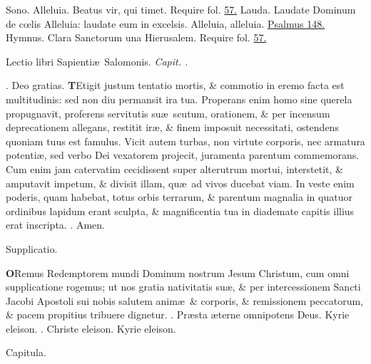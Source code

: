 \documentclass[letter,11pt]{book}
\makeatletter
\DeclareRobustCommand{\Rbar}{\vers@resp{0pt}{R}}
\newcommand{\vers@resp@sym}{\raisebox{0.2ex}{\rotatebox[origin=c]{-20}{$\m@th\rceil$}}}
\newcommand{\vers@resp}[2]{%
  {\ooalign{\hidewidth\kern#1\vers@resp@sym\hidewidth\cr#2\cr}}%
}%
\def\R{\color{Red} \Rbar . \color{black}}
\makeatother
\begin{document}
\begin{multicols*}{2}
\newline \color{Red} Sono. \color{black} Alleluia. Beatus vir, qui timet. \color{Red} Require fol. \color{black} \hyperlink{page.57}{57.}
\newline \color{Red} Lauda. \color{black} Laudate Dominum de c\oe lis Alleluia: laudate eum in excelsis. Alleluia, alleluia. \color{Red} \hyperlink{ps148}{Psalmus 148.} \color{black}
\newline \color{Red} Hymnus. \color{black} Clara Sanctorum una Hierusalem. \color{Red} Require fol. \color{black} \hyperlink{page.57}{57.}
\vspace{-.5em} \begin{center} {\color{Red} L}ectio libri Sapienti\ae \ Salomonis. \itshape Capit. . \color{black} \end{center} \vspace{-.5em}
\par \noindent \R Deo gratias.
\lettrine[lines=2]{\bfseries \color{Red} T}{}Etigit justum tentatio mortis, \& commotio in eremo facta est multitudinis: sed non diu permansit ira tua. Properans enim homo sine querela propugnavit, proferens servitutis su\ae \ scutum, orationem, \& per incensum deprecationem allegans, restitit ir\ae , \& finem imposuit necessitati, ostendens quoniam tuus est famulus. Vicit autem turbas, non virtute corporis, nec armatura potenti\ae , sed verbo Dei vexatorem projecit, juramenta parentum commemorans. Cum enim jam catervatim cecidissent super alterutrum mortui, interstetit, \& amputavit impetum, \& divisit illam, qu\ae \ ad vivos ducebat viam. In veste enim poderis, quam habebat, totus orbis terrarum, \& parentum magnalia in quatuor ordinibus lapidum erant sculpta, \& magnificentia tua in diademate capitis illius erat inscripta. \R Amen.
\vspace{-.5em} \begin{center} \color{Red} Supplicatio. \color{black} \end{center} \vspace{-.5em}
\lettrine[lines=2]{\bfseries \color{Red} O}{}Remus Redemptorem mundi Dominum nostrum Jesum Christum, cum omni supplicatione rogemus; ut nos gratia nativitatis su\ae , \& per intercessionem Sancti Jacobi Apostoli sui nobis salutem anim\ae \ \& corporis, \& remissionem peccatorum, \& pacem propitius tribuere dignetur. \R Pr\ae sta \ae terne omnipotens Deus. Kyrie eleison. \R Christe eleison. Kyrie eleison.
\vspace{-.5em} \begin{center} \color{Red} Capitula. \color{black} \end{center} \vspace{-.5em}

\end{multicols*}
\end{document}
